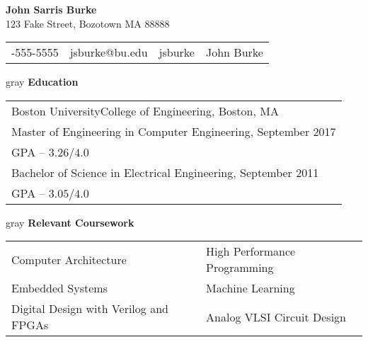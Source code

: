 \documentclass[11pt,letterpaper]{article}
\makeatletter
\newcommand{\vertspace}{\vspace{1.2mm}}
\newcommand{\name}{John Sarris Burke}
\newcommand{\address}{123 Fake Street, Bozotown MA 88888}
\newcommand{\phone}{555-555-5555}
\newcommand{\email}{jsburke@bu.edu}
\newcommand{\github}{jsburke}
\newcommand{\linkedin}{John Burke}
\newcommand{\undergradmajor}{Electrical Engineering}
\newcommand{\undergradend}{September 2011}
\newcommand{\grad}{Boston University}
\newcommand{\gradschool}{College of Engineering}
\newcommand{\gradmajor}{Computer Engineering}
\newcommand{\gradend}{September 2017}
\newlength\myheight
\newlength\mydepth
\newcommand*\inlineicon[1]{%
  \settototalheight\myheight{Xygp}%
  \settodepth\mydepth{Xygp}%
  \raisebox{-\mydepth}{\texttt{[image: \#1]}}%
}
\newcommand{\iconemail}{\inlineicon{email-icon-2048}\space}
\newcommand{\icongithub}{\inlineicon{GitHub-Mark-120px-plus}\space}
\newcommand{\iconphone}{\inlineicon{phone-icon-black}\space}
\newcommand{\iconlinkedin}{\inlineicon{linkedin-icon-black}\space}
\makeatother
\begin{document}
	
	\begin{center}	
		\textbf{\large \name}\\
		\address\\
		\begin{tabular}{c||c||c||c}
			\iconphone \phone & \iconemail \email & \icongithub \github & \iconlinkedin \linkedin \\
		\end{tabular}
	\end{center}

	\noindent
	\begin{heading}{gray}
		\textbf{Education}
	\end{heading}
		\begin{tabular}{l}
			\grad\space\gradschool , Boston, MA \\
			Master of Engineering in \gradmajor , \gradend \\
			GPA -- $3.26 / 4.0$ \\
			Bachelor of Science in \undergradmajor , \undergradend \\
			GPA -- $3.05 / 4.0$ \\
		\end{tabular}
	
	\vertspace
	\noindent	
	\begin{heading}{gray}
		\textbf{Relevant Coursework}
	\end{heading}
		\begin{tabular}{ll}
			Computer Architecture & High Performance Programming \\
			Embedded Systems      & Machine Learning \\
			Digital Design with Verilog and FPGAs & Analog VLSI Circuit Design \\
		\end{tabular}
		
\end{document}
